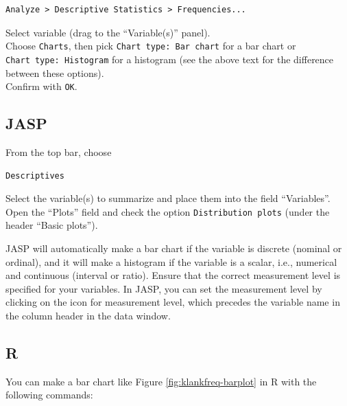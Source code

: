 \documentclass[
]{book}
\begin{document}
\begin{verbatim}
Analyze > Descriptive Statistics > Frequencies...
\end{verbatim}

Select variable (drag to the ``Variable(s)'' panel).\\
Choose \texttt{Charts}, then pick \texttt{Chart\ type:\ Bar\ chart} for a
bar chart or \texttt{Chart\ type:\ Histogram} for a histogram (see
the above text for the difference between these options).\\
Confirm with \texttt{OK}.\\

\subsection{JASP}\label{jasp-2}

From the top bar, choose

\begin{verbatim}
Descriptives
\end{verbatim}

Select the variable(s) to summarize and place them into the field ``Variables''. Open the ``Plots'' field and check the option \texttt{Distribution\ plots} (under the header ``Basic plots'').

JASP will automatically make a bar chart if the variable is discrete (nominal or ordinal), and it will make a histogram if the variable is a scalar, i.e., numerical and continuous (interval or ratio). Ensure that the correct measurement level is specified for your variables. In JASP, you can set the measurement level by clicking on the icon for measurement level, which precedes the variable name in the column header in the data window.

\subsection{R}\label{r-2}

You can make a bar chart like Figure \ref{fig:klankfreq-barplot} in R with the
following commands:
\end{document}
